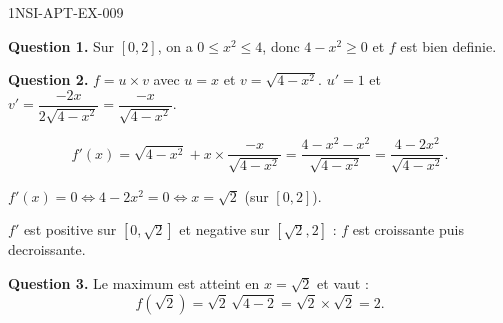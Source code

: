 \begin{corrige}{1NSI-APT-EX-009}

\textbf{Question 1.} Sur $[0,2]$, on a $0 \leq x^2 \leq 4$, donc $4 - x^2 \geq 0$ et $f$ est bien definie.


\textbf{Question 2.} $f = u \times v$ avec $u=x$ et $v=\sqrt{4-x^2}$.
$u'=1$ et $v' = \dfrac{-2x}{2\sqrt{4-x^2}} = \dfrac{-x}{\sqrt{4-x^2}}$.

\[ f'(x) = \sqrt{4-x^2} + x \times \frac{-x}{\sqrt{4-x^2}} = \frac{4-x^2-x^2}{\sqrt{4-x^2}} = \frac{4-2x^2}{\sqrt{4-x^2}}. \]

$f'(x) = 0 \iff 4-2x^2 = 0 \iff x = \sqrt{2}$ (sur $[0,2]$).

$f'$ est positive sur $[0,\sqrt{2}]$ et negative sur $[\sqrt{2}, 2]$ : $f$ est croissante puis decroissante.

\textbf{Question 3.} Le maximum est atteint en $x = \sqrt{2}$ et vaut :
\[ f(\sqrt{2}) = \sqrt{2}\,\sqrt{4-2} = \sqrt{2} \times \sqrt{2} = \boxed{2}. \]

\end{corrige}
